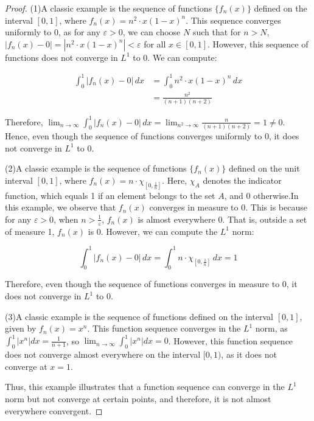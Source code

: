 \begin{proof}
    (1)A classic example is the sequence of functions 
    $\{f_n(x)\}$ defined on the interval $[0, 1]$, 
    where $f_n(x) = n^2 \cdot x(1-x)^n$. This sequence 
    converges uniformly to 0, as for any $\varepsilon > 0$, we 
    can choose $N$ such that for $n > N$, $|f_n(x) - 0| = 
    |n^2 \cdot x(1-x)^n| < \varepsilon$ for all $x \in [0, 1]$.
    However, this sequence of functions does not converge in 
    $L^1$ to 0. We can compute:

    $$
    \begin{aligned}
    \int_{0}^{1} |f_n(x) - 0| \, dx & = \int_{0}^{1} n^2 \cdot x(1-x)^n \, dx \\
    & = \frac{n^2}{(n+1)(n+2)}
    \end{aligned}
    $$

    Therefore, $\lim_{n \to \infty} \int_{0}^{1} |f_n(x) - 0| \, 
    dx = \lim_{n^2 \to \infty} \frac{n}{(n+1)(n+2)} = 1 \neq 0$. 
    Hence, even though the sequence of functions converges uniformly 
    to 0, it does not converge in $L^1$ to 0.

    (2)A classic example is the sequence of functions $\{f_n(x)\}$ 
    defined on the unit interval $[0, 1]$, where $f_n(x) = n \cdot 
    \chi_{[0, \frac{1}{n}]}$. Here, $\chi_A$ denotes the indicator 
    function, which equals 1 if an element belongs to the set $A$, 
    and 0 otherwise.In this example, we observe that $f_n(x)$ converges 
    in measure to 0. This is because for any $\varepsilon > 0$, when 
    $n > \frac{1}{\varepsilon}$, $f_n(x)$ is almost everywhere 0. 
    That is, outside a set of measure 1, $f_n(x)$ is 0.
    However, we can compute the $L^1$ norm:

    $$
    \int_{0}^{1} |f_n(x) - 0| \, dx = \int_{0}^{1} n \cdot 
    \chi_{[0, \frac{1}{n}]} \, dx = 1
    $$

    Therefore, even though the sequence of functions converges in 
    measure to 0, it does not converge in $L^1$ to 0.

    (3)A classic example is the sequence of functions defined on the 
    interval $[0,1]$, given by $f_n(x) = x^n$. This function sequence 
    converges in the $L^1$ norm, as $\int_0^1 |x^n| dx = \frac{1}{n+1}$, 
    so $\lim_{n \to \infty} \int_0^1 |x^n| dx = 0$. However, this function 
    sequence does not converge almost everywhere on the interval $[0,1)$,
    as it does not converge at $x=1$.

    Thus, this example illustrates that a function sequence can converge 
    in the $L^1$ norm 
    but not converge at certain points, and therefore, 
    it is not almost everywhere convergent.
    

\end{proof}
